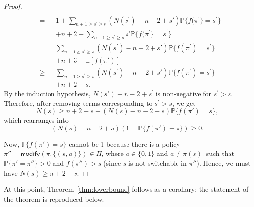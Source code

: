 \begin{appendices}
\begin{proof}
\begin{align*}
\\
&=&& 1+\sum_{n+1 \ge s^\prime \ge s}(N(s^\prime)-n-2+s')\mathbb{P}\{f(\pi^{\prime}\}=s^\prime\}
\\
&&&+n+2-\sum_{n+1 \ge s^\prime \ge s}s'\mathbb{P}\{f(\pi^{\prime}\}=s^\prime\}
\\
&=&& \sum_{n+1 \ge s^\prime \ge s}(N(s^\prime)-n-2+s')\mathbb{P}\{f(\pi^{\prime})=s^\prime\}
\\
&&&+n+3-\mathbb{E}[f(\pi')]
\\
&\ge && \sum_{n+1 \ge s^\prime \ge s}(N(s^\prime)-n-2+s')\mathbb{P}\{f(\pi^{\prime})=s^\prime\}
\\
&&&+n+2-s.
\end{align*}
By the induction hypothesis, $N(s')-n-2+s^{\prime}$ is non-negative for $s^{\prime}>s$. Therefore, after removing terms corresponding to $s^{\prime}>s$, we get $$ N(s) \ge n+2-s+(N(s)-n-2+s)\mathbb{P}\{f(\pi')=s\},$$ which rearranges into $$(N(s)-n-2+s)(1-\mathbb{P}\{f(\pi')=s\})\ge 0 .$$

Now, $\mathbb{P}\{f(\pi')=s\}$ cannot be $1$ because there is a policy $\pi''=\textsf{modify}(\pi, \{(s, a)\}) \in \Pi$, where $a\in \{0,1\}$ and $a\ne\pi(s)$, such that $\mathbb{P}\{\pi'=\pi''\}>0$ and $f(\pi'')>s$ (since $s$ is not switchable in $\pi''$). Hence, we must have
$N(s) \ge n+2-s$.
\end{proof}

At this point, Theorem~\ref{thm:lowerbound} follows as a corollary; the statement of the theorem is reproduced below.


\end{appendices}
